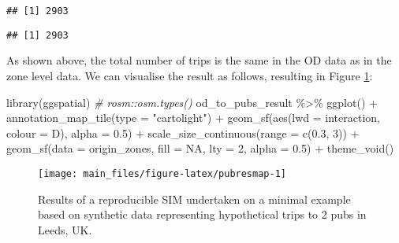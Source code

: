 \documentclass[11pt,letterpaper]{article}
\newenvironment{Shaded}{\begin{snugshade}}{\end{snugshade}}
\newcommand{\AttributeTok}[1]{\textcolor[rgb]{0.77,0.63,0.00}{#1}}
\newcommand{\CommentTok}[1]{\textcolor[rgb]{0.56,0.35,0.01}{\textit{#1}}}
\newcommand{\ConstantTok}[1]{\textcolor[rgb]{0.00,0.00,0.00}{#1}}
\newcommand{\DecValTok}[1]{\textcolor[rgb]{0.00,0.00,0.81}{#1}}
\newcommand{\FloatTok}[1]{\textcolor[rgb]{0.00,0.00,0.81}{#1}}
\newcommand{\FunctionTok}[1]{\textcolor[rgb]{0.00,0.00,0.00}{#1}}
\newcommand{\NormalTok}[1]{#1}
\newcommand{\SpecialCharTok}[1]{\textcolor[rgb]{0.00,0.00,0.00}{#1}}
\newcommand{\StringTok}[1]{\textcolor[rgb]{0.31,0.60,0.02}{#1}}
\begin{document}
\begin{verbatim}
## [1] 2903
\end{verbatim}

\begin{Shaded}
\end{Shaded}

\begin{verbatim}
## [1] 2903
\end{verbatim}

As shown above, the total number of trips is the same in the OD data as in the zone level data.
We can visualise the result as follows, resulting in Figure \ref{fig:pubresmap}:

\begin{Shaded}
\begin{Highlighting}[]
\FunctionTok{library}\NormalTok{(ggspatial)}
\CommentTok{\# rosm::osm.types()}
\NormalTok{od\_to\_pubs\_result }\SpecialCharTok{\%\textgreater{}\%} 
  \FunctionTok{ggplot}\NormalTok{() }\SpecialCharTok{+}
  \FunctionTok{annotation\_map\_tile}\NormalTok{(}\AttributeTok{type =} \StringTok{"cartolight"}\NormalTok{) }\SpecialCharTok{+}
  \FunctionTok{geom\_sf}\NormalTok{(}\FunctionTok{aes}\NormalTok{(}\AttributeTok{lwd =}\NormalTok{ interaction, }\AttributeTok{colour =}\NormalTok{ D), }\AttributeTok{alpha =} \FloatTok{0.5}\NormalTok{) }\SpecialCharTok{+}
  \FunctionTok{scale\_size\_continuous}\NormalTok{(}\AttributeTok{range =} \FunctionTok{c}\NormalTok{(}\FloatTok{0.3}\NormalTok{, }\DecValTok{3}\NormalTok{)) }\SpecialCharTok{+}
  \FunctionTok{geom\_sf}\NormalTok{(}\AttributeTok{data =}\NormalTok{ origin\_zones, }\AttributeTok{fill =} \ConstantTok{NA}\NormalTok{, }\AttributeTok{lty =} \DecValTok{2}\NormalTok{, }\AttributeTok{alpha =} \FloatTok{0.5}\NormalTok{) }\SpecialCharTok{+}
  \FunctionTok{theme\_void}\NormalTok{()}
\end{Highlighting}
\end{Shaded}

\begin{figure}
\texttt{[image: main\_files/figure-latex/pubresmap-1]} \caption{Results of a reproducible SIM undertaken on a minimal example based on synthetic data representing hypothetical trips to 2 pubs in Leeds, UK.}\label{fig:pubresmap}
\end{figure}
\end{document}
